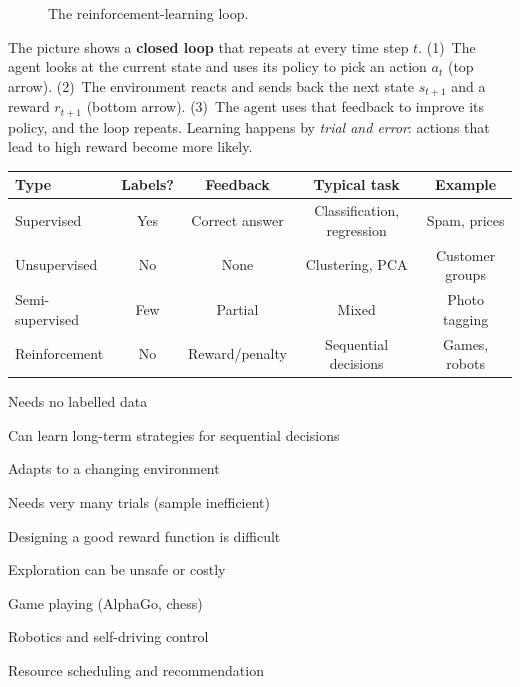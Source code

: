 \begin{figure}[!htbp]
\centering
{}
\caption{The reinforcement-learning loop.}\label{fig:rl}
\end{figure}

\begin{explain}
The picture shows a \textbf{closed loop} that repeats at every time step $t$. (1)~The agent looks at the current state and uses its policy to pick an action $a_t$ (top arrow). (2)~The environment reacts and sends back the next state $s_{t+1}$ and a reward $r_{t+1}$ (bottom arrow). (3)~The agent uses that feedback to improve its policy, and the loop repeats. Learning happens by \emph{trial and error}: actions that lead to high reward become more likely.
\end{explain}

\begin{center}
\begin{tabular}{@{}lcccc@{}}
\toprule
\textbf{Type} & \textbf{Labels?} & \textbf{Feedback} & \textbf{Typical task} & \textbf{Example}\\
\midrule
Supervised & Yes & Correct answer & Classification, regression & Spam, prices\\
Unsupervised & No & None & Clustering, PCA & Customer groups\\
Semi-supervised & Few & Partial & Mixed & Photo tagging\\
Reinforcement & No & Reward/penalty & Sequential decisions & Games, robots\\
\bottomrule
\end{tabular}
\end{center}


{\item Needs no labelled data
 \item Can learn long-term strategies for sequential decisions
 \item Adapts to a changing environment}
{\item Needs very many trials (sample inefficient)
 \item Designing a good reward function is difficult
 \item Exploration can be unsafe or costly}
{\item Game playing (AlphaGo, chess)
 \item Robotics and self-driving control
 \item Resource scheduling and recommendation}

